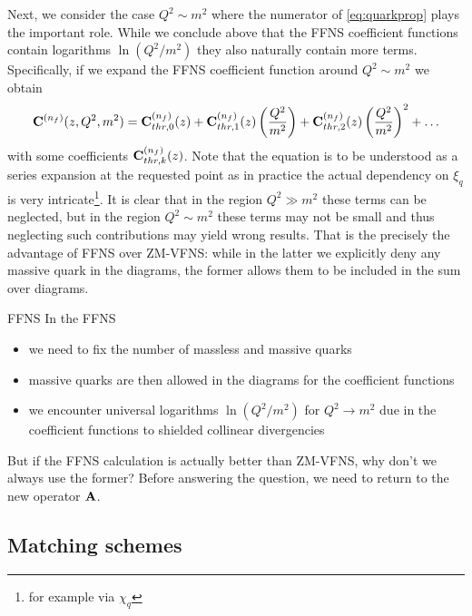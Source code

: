 Next, we consider the case $Q^2 \sim m^2$ where the numerator of \cref{eq:quarkprop} plays the important role.
While we conclude above that the FFNS coefficient functions contain logarithms $\ln(Q^2/m^2)$ they also naturally contain more terms.
Specifically, if we expand the FFNS coefficient function around $Q^2 \sim m^2$ we obtain
\begin{equation}
    \vb C^{(n_f)}(z,Q^2,m^2) = \vb C_{thr,0}^{(n_f)}(z) + \vb C_{thr,1}^{(n_f)}(z) \left(\frac{Q^2}{m^2}\right) + \vb C_{thr,2}^{(n_f)}(z) \left(\frac{Q^2}{m^2}\right)^2 + \ldots \label{eq:Cpower}
\end{equation}
with some coefficients $\vb C_{thr,k}^{(n_f)}(z)$.
Note that the equation is to be understood as a series expansion at the requested point as in practice the actual dependency on $\xi_q$ is very intricate\footnote{for example via $\chi_q$}.
It is clear that in the region $Q^2 \gg m^2$ these terms can be neglected, but in the region $Q^2 \sim m^2$ these terms may not be small and thus neglecting such contributions may yield wrong results.
That is the precisely the advantage of FFNS over ZM-VFNS: while in the latter we explicitly deny any massive quark in the diagrams, the former allows them to be included in the sum over diagrams.

\begin{conclusionbox}{FFNS}
    In the FFNS
    \begin{itemize}
        \item we need to fix the number of massless and massive quarks
        \item massive quarks are then allowed in the diagrams for the coefficient functions
        \item we encounter universal logarithms $\ln(Q^2/m^2)$ for $Q^2\to m^2$ due in the coefficient functions to shielded collinear divergencies
    \end{itemize}
\end{conclusionbox}

But if the FFNS calculation is actually better than ZM-VFNS, why don't we always use the former?
Before answering the question, we need to return to the new operator $\vb A$.

\subsection{Matching schemes}
\label{sec:matching}

